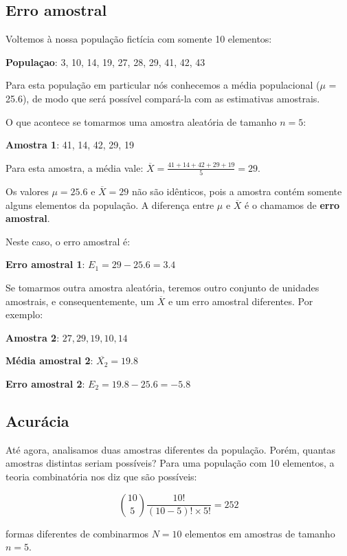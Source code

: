 \documentclass[
]{book}
\begin{document}
\hypertarget{erro-amostral}{%
\subsection{Erro amostral}\label{erro-amostral}}

Voltemos à nossa população fictícia com somente 10 elementos:

\textbf{Populaçao}: 3, 10, 14, 19, 27, 28, 29, 41, 42, 43

Para esta população em particular nós conhecemos a média populacional (\(\mu\) = 25.6), de modo que será possível compará-la com as estimativas amostrais.

O que acontece se tomarmos uma amostra aleatória de tamanho \(n = 5\):

\textbf{Amostra 1}: 41, 14, 42, 29, 19

Para esta amostra, a média vale: \(\overline{X} =\frac{41+14+42+29+19}{5} = 29\).

Os valores \(\mu = 25.6\) e \(\overline{X} = 29\) não são idênticos, pois a amostra contém somente alguns elementos da população. A diferença entre \(\mu\) e \(\overline{X}\) é o chamamos de \textbf{erro amostral}.

Neste caso, o erro amostral é:

\textbf{Erro amostral 1}: \(E_1 = 29 - 25.6 = 3.4\)

Se tomarmos outra amostra aleatória, teremos outro conjunto de unidades amostrais, e consequentemente, um \(\overline{X}\) e um erro amostral diferentes. Por exemplo:

\textbf{Amostra 2}: \(27, 29, 19, 10, 14\)

\textbf{Média amostral 2}: \(\overline{X_2} = 19.8\)

\textbf{Erro amostral 2}: \(E_2 = 19.8 - 25.6 = -5.8\)

\hypertarget{acuruxe1cia}{%
\subsection{Acurácia}\label{acuruxe1cia}}

Até agora, analisamos duas amostras diferentes da população. Porém, quantas amostras distintas seriam possíveis? Para uma população com 10 elementos, a teoria combinatória nos diz que são possíveis:

\[{{10}\choose{5}} \frac{10!}{(10-5)! \times 5!} = 252\]

formas diferentes de combinarmos \(N = 10\) elementos em amostras de tamanho \(n = 5\).
\end{document}
